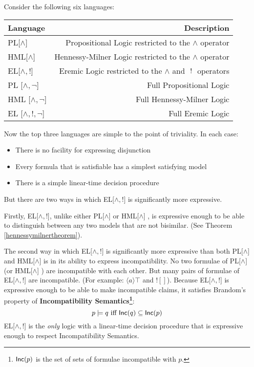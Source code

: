
Consider the following six languages:
\begin{center}
\begin{tabular}{ l | r }
Language & Description \\
\hline
PL[$\land$] & Propositional Logic restricted to the $\land$ operator \\
HML[$\land$] & Hennessy-Milner Logic restricted to the $\land$ operator \\
EL[$\land, !$] & Eremic Logic restricted to the $\land$ and $\ ! \ $ operators \\
PL [$\land, \neg$] & Full Propositional Logic \\
HML [$\land, \neg$] & Full Hennessy-Milner Logic \\
EL [$\land, !, \neg$] & Full Eremic Logic \\
\end{tabular}
\end{center}
Now the top three languages are simple to the point of triviality. In each case:
\begin{itemize}
\item
There is no facility for expressing disjunction
\item
Every formula that is satisfiable has a simplest satisfying model
\item
There is a simple linear-time decision procedure
\end{itemize}
But there are two ways in which EL[$\land, !$]  is significantly more expressive.

Firstly, EL[$\land, !$], unlike either PL[$\land$] or HML[$\land$] , is expressive enough to be able to distinguish between any two models that are not bisimilar. (See Theorem \ref{hennessymilnertheorem}).

The second way in which EL[$\land, !$] is significantly more expressive than both PL[$\land$] and HML[$\land$] is in its ability to express incompatibility.
No two formulae of PL[$\land$] (or HML[$\land$] ) are incompatible with each other. 
But many pairs of formulae of EL[$\land, !$] are incompatible.
(For example: $\langle a \rangle \top$ and $! []$). 
Because EL[$\land, !$]  is expressive enough to be able to make incompatible claims, it satisfies Brandom's property of {\bf Incompatibility Semantics\footnote{$\mathsf{Inc}(p)$ is the set of sets of formulae incompatible with $p$.}}:
\[
p \models q \mbox{ iff } \mathsf{Inc}(q) \subseteq \mathsf{Inc}(p)
\]
EL[$\land, !$]  is the \emph{only} logic with a linear-time decision procedure that is expressive enough to respect Incompatibility Semantics.

